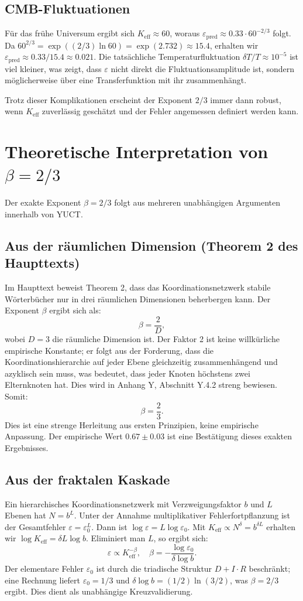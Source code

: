\documentclass[12pt]{article}
\newcommand{\Keff}{K_{\mathrm{eff}}}
\newcommand{\eps}{\varepsilon}
\begin{document}
	\subsection*{CMB-Fluktuationen}
	Für das frühe Universum ergibt sich \(\Keff \approx 60\), woraus \(\eps_{\text{pred}} \approx 0.33 \cdot 60^{-2/3}\) folgt. Da \(60^{2/3} = \exp((2/3)\ln 60) = \exp(2.732) \approx 15.4\), erhalten wir \(\eps_{\text{pred}} \approx 0.33/15.4 \approx 0.021\). Die tatsächliche Temperaturfluktuation \(\delta T/T \approx 10^{-5}\) ist viel kleiner, was zeigt, dass \(\eps\) nicht direkt die Fluktuationsamplitude ist, sondern möglicherweise über eine Transferfunktion mit ihr zusammenhängt.
	
	Trotz dieser Komplikationen erscheint der Exponent \(2/3\) immer dann robust, wenn \(\Keff\) zuverlässig geschätzt und der Fehler angemessen definiert werden kann.
	
	\section{Theoretische Interpretation von \(\beta = 2/3\)}
	\label{sec:derivation}
	
	Der exakte Exponent \(\beta = 2/3\) folgt aus mehreren unabhängigen Argumenten innerhalb von YUCT.
	
	\subsection*{Aus der räumlichen Dimension (Theorem 2 des Haupttexts)}
	Im Haupttext beweist Theorem 2, dass das Koordinationsnetzwerk stabile Wörterbücher nur in drei räumlichen Dimensionen beherbergen kann. Der Exponent \(\beta\) ergibt sich als:
	\[
	\beta = \frac{2}{D},
	\]
	wobei \(D = 3\) die räumliche Dimension ist. Der Faktor 2 ist keine willkürliche empirische Konstante; er folgt aus der Forderung, dass die Koordinationshierarchie auf jeder Ebene gleichzeitig zusammenhängend und azyklisch sein muss, was bedeutet, dass jeder Knoten höchstens zwei Elternknoten hat. Dies wird in Anhang Y, Abschnitt Y.4.2 streng bewiesen. Somit:
	\[
	\beta = \frac{2}{3}.
	\]
	Dies ist eine strenge Herleitung aus ersten Prinzipien, keine empirische Anpassung. Der empirische Wert \(0.67 \pm 0.03\) ist eine Bestätigung dieses exakten Ergebnisses.
	
	\subsection*{Aus der fraktalen Kaskade}
	Ein hierarchisches Koordinationsnetzwerk mit Verzweigungsfaktor \(b\) und \(L\) Ebenen hat \(N = b^L\). Unter der Annahme multiplikativer Fehlerfortpflanzung ist der Gesamtfehler \(\eps = \eps_0^{L}\). Dann ist \(\log \eps = L \log \eps_0\). Mit \(\Keff \propto N^{\delta} = b^{\delta L}\) erhalten wir \(\log \Keff = \delta L \log b\). Eliminiert man \(L\), so ergibt sich:
	\[
	\eps \propto \Keff^{-\beta}, \quad \beta = -\frac{\log \eps_0}{\delta \log b}.
	\]
	Der elementare Fehler \(\eps_0\) ist durch die triadische Struktur \(D+I\!\cdot\!R\) beschränkt; eine Rechnung liefert \(\eps_0 = 1/3\) und \(\delta \log b = (1/2)\ln(3/2)\), was \(\beta = 2/3\) ergibt. Dies dient als unabhängige Kreuzvalidierung.
	
\end{document}
